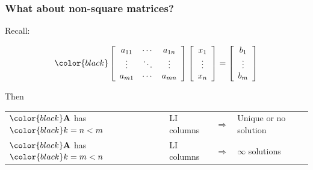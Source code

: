 \documentclass[compress]{beamer}
\newcommand{\black}[1]{{\color{black}#1}}
\newcommand{\beq}[1]{\[\black{#1}\]}
\begin{document}
\begin{frame}
\frametitle{What about non-square matrices?}

\vspace{.5cm}
Recall:

\beq{
\left[ 
\begin{array}{ccc}
a_{11} & \cdots & a_{1n}\\
\vdots & \ddots & \vdots\\
a_{m1} &\cdots & a_{mn}
\end{array}
\right]\left[
\begin{array}{c}
x_1\\
\vdots\\
x_n
\end{array}
\right] = 
\left[
\begin{array}{c}
b_1\\
\vdots\\
b_m
\end{array}
\right]
}

\vspace{.5cm}
Then

\vspace{.5cm}

\begin{tabular}{llcl}
$\black{\A}$ has $\black{k = n < m}$ & LI columns & $\Rightarrow$ & Unique or no solution\\
$\black{\A}$ has $\black{k = m < n}$ & LI columns & $\Rightarrow$ & $\infty$ solutions
\end{tabular}

\end{frame}

\end{document}

